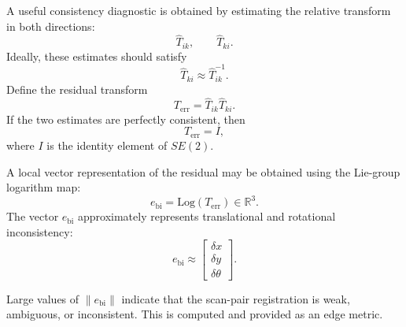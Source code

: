 \documentclass[11pt]{article}
\begin{document}
A useful consistency diagnostic is obtained by estimating the
relative transform in both directions:
\begin{equation}
\hat T_{ik},
\qquad
\hat T_{ki}.
\end{equation}
Ideally, these estimates should satisfy
\begin{equation}
\hat T_{ki} \approx \hat T_{ik}^{-1}.
\end{equation}
Define the residual transform
\begin{equation}
T_{\mathrm{err}}
=
\hat T_{ik}\hat T_{ki}.
\end{equation}
If the two estimates are perfectly consistent, then
\begin{equation}
T_{\mathrm{err}} = I,
\end{equation}
where $I$ is the identity element of $SE(2)$.

A local vector representation of the residual may be obtained using
the Lie-group logarithm map:
\begin{equation}
e_{\mathrm{bi}}
=
\mathrm{Log}(T_{\mathrm{err}})
\in \mathbb{R}^3.
\end{equation}
The vector $e_{\mathrm{bi}}$ approximately represents
translational and rotational inconsistency:
\begin{equation}
e_{\mathrm{bi}}
\approx
\begin{bmatrix}
\delta x \\
\delta y \\
\delta \theta
\end{bmatrix}.
\end{equation}

Large values of $\|e_{\mathrm{bi}}\|$ indicate that the scan-pair
registration is weak, ambiguous, or inconsistent. This is computed and provided as an edge metric.
\end{document}
